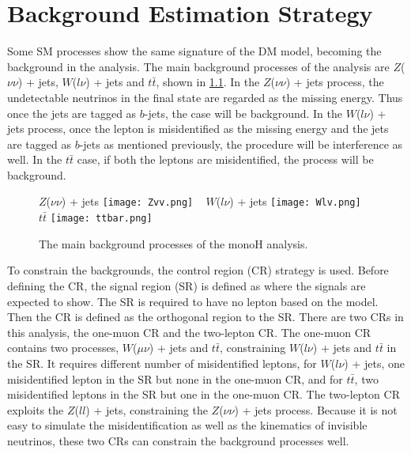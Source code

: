 \documentclass[class=NTHU_thesis, crop=false]{standalone}
\begin{document}
\chapter{Background Estimation Strategy}
\label{chap:estimation_strategy}
Some SM processes show the same signature of the DM model, becoming the background in the analysis. The main background processes of the analysis are $Z$($\nu\nu$) + jets, $W$($l\nu$) + jets and $t\bar{t}$, shown in \cref{fig:Bkg-Processes}. In the $Z$($\nu\nu$) + jets process, the undetectable neutrinos in the final state are regarded as the missing energy. Thus once the jets are tagged as $b$-jets, the case will be background. In the $W$($l\nu$) + jets process, once the lepton is misidentified as the missing energy and the jets are tagged as $b$-jets as mentioned previously, the procedure will be interference as well. In the $t\bar{t}$ case, if both the leptons are misidentified, the process will be background.

\begin{figure}[!hbt]
	\captionsetup[subfigure]{labelformat=empty}
	\centering
	\subcaptionbox
	{$Z$($\nu\nu$) + jets
		\label{fig:Bkg-Processes-fig1}}
	{\texttt{[image: Zvv.png]}}
	~
	\subcaptionbox
	{$W$($l\nu$) + jets
		\label{fig:Bkg-Processes-fig2}}
	{\texttt{[image: Wlv.png]}}
	~
	\subcaptionbox
	{$t\bar{t}$
		\label{fig:Bkg-Processes-fig3}}
	{\texttt{[image: ttbar.png]}}
	\caption{The main background processes of the monoH analysis.}
	\label{fig:Bkg-Processes}
\end{figure}

To constrain the backgrounds, the control region (CR) strategy is used. Before defining the CR, the signal region (SR) is defined as where the signals are expected to show. The SR is required to have no lepton based on the model. Then the CR is defined as the orthogonal region to the SR. There are two CRs in this analysis, the one-muon CR and the two-lepton CR. The one-muon CR contains two processes, $W$($\mu\nu$) + jets and $t\bar{t}$, constraining $W$($l\nu$) + jets and $t\bar{t}$ in the SR. It requires different number of misidentified leptons, for $W$($l\nu$) + jets, one misidentified lepton in the SR but none in the one-muon CR, and for $t\bar{t}$, two misidentified leptons in the SR but one in the one-muon CR. The two-lepton CR exploits the $Z$($ll$) + jets, constraining the $Z$($\nu\nu$) + jets process. Because it is not easy to simulate the misidentification as well as the kinematics of invisible neutrinos, these two CRs can constrain the background processes well.
\end{document}
